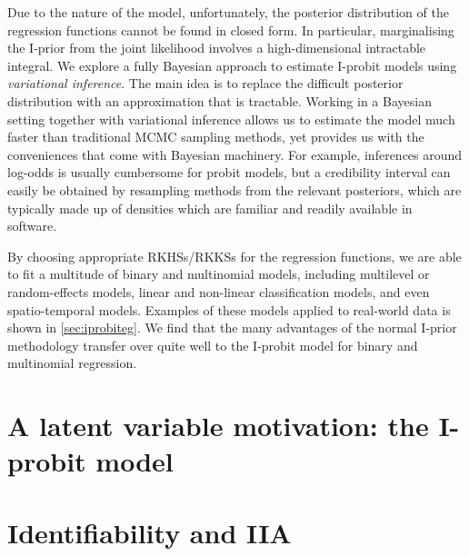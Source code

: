 \documentclass[a4paper,showframe,11pt]{report}
\begin{document}

Due to the nature of the model, unfortunately, the posterior distribution of the regression functions cannot be found in closed form.
In particular, marginalising the I-prior from the joint likelihood involves a high-dimensional intractable integral.
We explore a fully Bayesian approach to estimate I-probit models using \emph{variational inference}.
The main idea is to replace the difficult posterior distribution with an approximation that is tractable.
Working in a Bayesian setting together with variational inference allows us to estimate the model much faster than traditional MCMC sampling methods, yet provides us with the conveniences that come with Bayesian machinery.
For example, inferences around log-odds is usually cumbersome for probit models, but a credibility interval can easily be obtained by resampling methods from the relevant posteriors, which are typically made up of densities which are familiar and readily available in software.

By choosing appropriate RKHSs/RKKSs for the regression functions, we are able to fit a multitude of binary and multinomial models, including multilevel or random-effects models, linear and non-linear classification models, and even spatio-temporal models.
Examples of these models applied to real-world data is shown in  \cref{sec:iprobiteg}.
We find that the many advantages of the normal I-prior methodology  transfer over quite well to the I-probit model for binary and multinomial regression.

%

\section{A latent variable motivation: the I-probit model}


\section{Identifiability and IIA}\label{sec:iia}

\end{document}
